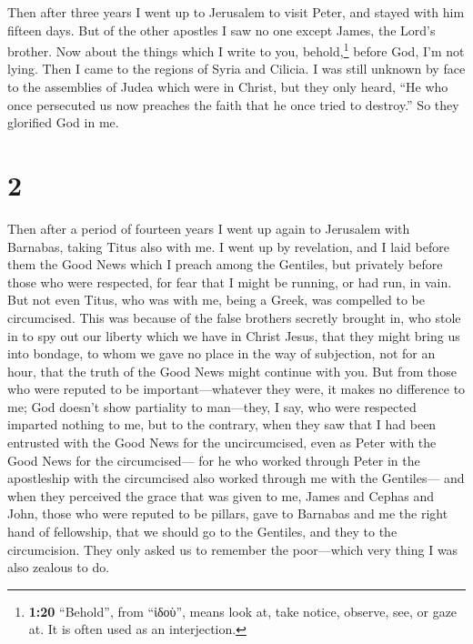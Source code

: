  Then after three years I went up to Jerusalem to visit
Peter, and stayed with him fifteen days.  But of the
other apostles I saw no one except James, the Lord's brother.
 Now about the things which I write to you,
behold,\footnote{\textbf{1:20} ``Behold'', from ``ἰδοὺ'', means look at,
  take notice, observe, see, or gaze at. It is often used as an
  interjection.} before God, I'm not lying.  Then I came
to the regions of Syria and Cilicia.  I was still unknown
by face to the assemblies of Judea which were in Christ, 
but they only heard, ``He who once persecuted us now preaches the faith
that he once tried to destroy.''  So they glorified God
in me.

\hypertarget{section-1}{%
\section{2}\label{section-1}}

 Then after a period of fourteen years I went up again to
Jerusalem with Barnabas, taking Titus also with me.  I
went up by revelation, and I laid before them the Good News which I
preach among the Gentiles, but privately before those who were
respected, for fear that I might be running, or had run, in vain.
 But not even Titus, who was with me, being a Greek, was
compelled to be circumcised.  This was because of the
false brothers secretly brought in, who stole in to spy out our liberty
which we have in Christ Jesus, that they might bring us into bondage,
 to whom we gave no place in the way of subjection, not
for an hour, that the truth of the Good News might continue with you.
 But from those who were reputed to be
important---whatever they were, it makes no difference to me; God
doesn't show partiality to man---they, I say, who were respected
imparted nothing to me,  but to the contrary, when they
saw that I had been entrusted with the Good News for the uncircumcised,
even as Peter with the Good News for the circumcised--- 
for he who worked through Peter in the apostleship with the circumcised
also worked through me with the Gentiles---  and when they
perceived the grace that was given to me, James and Cephas and John,
those who were reputed to be pillars, gave to Barnabas and me the right
hand of fellowship, that we should go to the Gentiles, and they to the
circumcision.  They only asked us to remember the
poor---which very thing I was also zealous to do.

